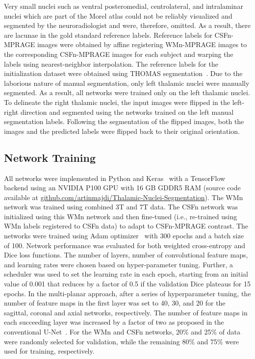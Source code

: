 Very small nuclei such as ventral posteromedial, centrolateral, and intralaminar nuclei which are part of the Morel atlas could not be reliably visualized and segmented by the neuroradiologist and were, therefore, omitted. As a result, there are lacunae in the gold standard reference labels. Reference labels for CSFn-MPRAGE images were obtained by affine registering WMn-MPRAGE images to the corresponding CSFn-MPRAGE images for each subject and warping the labels using nearest-neighbor interpolation. The reference labels for the initialization dataset were obtained using THOMAS segmentation~\cite{su_Thalamus_2019}. Due to the laborious nature of manual segmentation, only left thalamic nuclei were manually segmented. As a result, all networks were trained only on the left thalamic nuclei. To delineate the right thalamic nuclei, the input images were flipped in the left-right direction and segmented using the networks trained on the left manual segmentation labels. Following the segmentation of the flipped images, both the images and the predicted labels were flipped back to their original orientation.

\subsection{Network Training}

All networks were implemented in Python and Keras~\cite{keras_2023} with a TensorFlow backend using an NVIDIA P100 GPU with 16 GB GDDR5 RAM (source code available at \url{github.com/artinmajdi/Thalamic-Nuclei-Segmentation}). The WMn network was trained using combined 3T and 7T data. The CSFn network was initialized using this WMn network and then fine-tuned (i.e., re-trained using WMn labels registered to CSFn data) to adapt to CSFn-MPRAGE contrast. The networks were trained using Adam optimizer~\cite{kingma_Adam_2014} with 300 epochs and a batch size of 100. Network performance was evaluated for both weighted cross-entropy and Dice loss functions. The number of layers, number of convolutional feature maps, and learning rates were chosen based on hyper-parameter tuning. Further, a scheduler was used to set the learning rate in each epoch, starting from an initial value of 0.001 that reduces by a factor of 0.5 if the validation Dice plateaus for 15 epochs. In the multi-planar approach, after a series of hyperparameter tuning, the number of feature maps in the first layer was set to 40, 30, and 20 for the sagittal, coronal and axial networks, respectively. The number of feature maps in each succeeding layer was increased by a factor of two as proposed in the conventional U-Net~\cite{ronneberger_UNet_2015}. For the WMn and CSFn networks, 20\% and 25\% of data were randomly selected for validation, while the remaining 80\% and 75\% were used for training, respectively.

